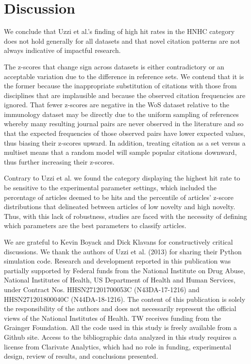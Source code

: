 \documentclass[NETN]{stjour}
\begin{document}
\section{Discussion}

We conclude that Uzzi et al.'s finding of high hit rates in the HNHC category does not hold generally for all datasets and that novel citation patterns are not always indicative of impactful research.

The z-scores that change sign across datasets is either contradictory or an acceptable variation due to the difference in reference sets. We contend that it is the former because the inappropriate substitution of citations with those from disciplines that are implausible and because the observed citation frequencies are ignored. That fewer z-scores are negative in the WoS dataset relative to the immunology dataset may be directly due to the uniform sampling of references whereby many resulting journal pairs are never observed in the literature and so that the expected frequencies of those observed pairs have lower expected values, thus biasing their z-scores upward. In addition, treating citation as a set versus a multiset means that a random model will sample popular citations downward, thus further increasing their z-scores.

Contrary to Uzzi et al. we found the category displaying the highest hit rate to be sensitive to the experimental parameter settings, which included the percentage of articles deemed to be hits and the percentile of articles' z-score distributions that delineated between articles of low novelty and high novelty. Thus, with this lack of robustness, studies are faced with the necessity of defining which parameters are the best parameters to classify articles.

\acknowledgments
We are grateful to Kevin Boyack and Dick Klavans for constructively critical discussions. We thank the authors of Uzzi et al. (2013) for sharing their Python simulation code. Research and development reported in this publication was partially supported by Federal funds from the National Institute on Drug Abuse, National Institutes of Health, US Department of Health and Human Services, under Contract Nos. HHSN271201700053C (N43DA-17-1216) and HHSN271201800040C (N44DA-18-1216). The content of this publication is solely the responsibility of the authors and does not necessarily represent the official views of the National Institutes of Health. TW receives funding from the Grainger Foundation. All the code used in this study is freely available from a Github site. Access to the bibliographic data analyzed in this study requires a license from Clarivate Analytics, which had no role in funding, experimental design, review of results, and conclusions presented. 
\end{document}

